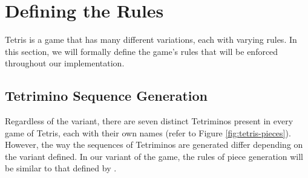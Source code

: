 \documentclass[a4paper, 12pt]{extreport}
\begin{document}
		\section{Defining the Rules}\label{sec:rules}
			Tetris is a game that has many different variations, each with varying rules. In this section, we will formally define the game's rules that will be enforced throughout our implementation.
			
			\subsection{Tetrimino Sequence Generation}
			
				Regardless of the variant, there are seven distinct Tetriminos present in every game of Tetris, each with their own names (refer to Figure \ref{fig:tetris-pieces}). However, the way the sequences of Tetriminos are generated differ depending on the variant defined. In our variant of the game, the rules of piece generation will be similar to that defined by \citeauthor{tetris-drl-2} \cite{tetris-drl-2}.
				
\end{document}

